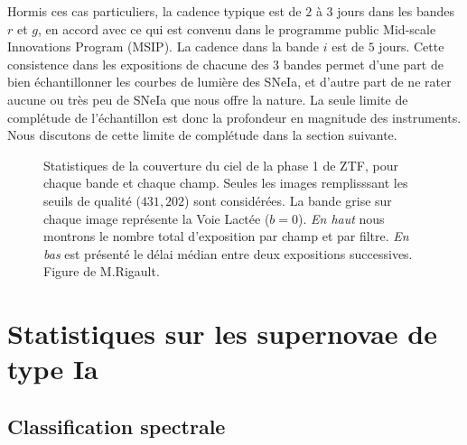 \documentclass[../main/main.tex]{subfiles}
\begin{document}
Hormis ces cas particuliers, la cadence typique est de $2$ à $3$ jours
dans les bandes $r$ et $g$, en accord avec ce qui est convenu dans le
programme public Mid-scale Innovations Program (MSIP). La cadence dans
la bande $i$ est de $5$ jours. Cette consistence dans les expositions de
chacune des $3$ bandes permet d'une part de bien échantillonner les courbes de
lumière des SNeIa, et d'autre part de ne rater aucune ou très peu de
SNeIa que nous offre la nature. La seule limite de complétude de
l'échantillon est donc la profondeur en magnitude des instruments. Nous
discutons de cette limite de complétude dans la section suivante.

\begin{figure}[ht]
  \centering
  \caption[Statistiques de la couverture du ciel de la phase 1 de
  ZTF.]{Statistiques de la couverture du ciel de la phase 1 de ZTF, pour
    chaque bande et chaque champ. Seules les images remplisssant les
    seuils de qualité ($431,202$) sont considérées. La bande grise sur
    chaque image représente la Voie Lactée ($b=0$). \emph{En haut} nous
    montrons le nombre total d'exposition par champ et par
    filtre. \emph{En bas} est présenté le délai médian entre deux
    expositions successives. Figure de M.Rigault.}
  \label{fig:skycoverage}
\end{figure}

\section{Statistiques sur les supernovae de type Ia}

\subsection{Classification spectrale}
\end{document}
